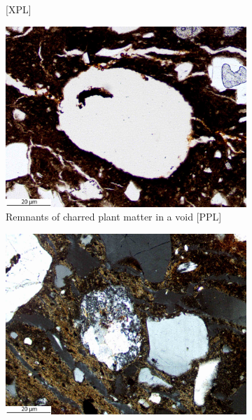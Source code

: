 \documentclass[a4paper]{article}
\begin{document}
\begin{figure}[H]
\begin{subfigure}[t]{.49\textwidth}
		\caption{[XPL]}
	\end{subfigure}
	\begin{subfigure}[t]{.32\textwidth}
		\includegraphics[width=\textwidth]{ThinSections/97-4_10x_PPL.jpg}
		\caption{Remnants of charred plant matter in a void [PPL]}
	\end{subfigure}\hspace{.1em}\hfill
	\begin{subfigure}[t]{.32\textwidth}
		\includegraphics[width=\textwidth]{ThinSections/97-3_10x_XPL.jpg}

\end{subfigure}
\end{figure}
\end{document}
